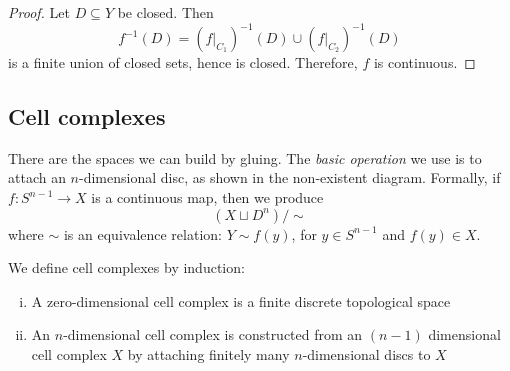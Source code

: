 \documentclass{article}
\begin{document}
\begin{proof}
    Let $D \subseteq Y$ be closed.  Then
    \begin{equation*}
        f^{-1}(D) = (f|_{C_1})^{-1} (D) \cup (f|_{C_2})^{-1} (D)
    \end{equation*}
    is a finite union of closed sets, hence is closed.  Therefore, $f$ is continuous.
\end{proof}

\subsection{Cell complexes}
There are the spaces we can build by gluing.  The \emph{basic operation} we use is to attach an $n$-dimensional disc, as shown in the non-existent diagram.
Formally, if $f: S^{n-1} \to X$ is a continuous map, then we produce
\begin{equation}
    (X \sqcup D^n) / \sim
\end{equation}
where $\sim$ is an equivalence relation: $Y \sim f(y)$, for $y \in S^{n-1}$ and $f(y) \in X$.
\begin{defi}
    We define cell complexes by induction:
    \begin{enumerate}[(i)]
        \item A zero-dimensional cell complex is a finite discrete topological space
        \item An $n$-dimensional cell complex is constructed from an $(n-1)$ dimensional cell complex $X$ by attaching finitely many $n$-dimensional discs to $X$
    \end{enumerate}
\end{defi}
\end{document}
